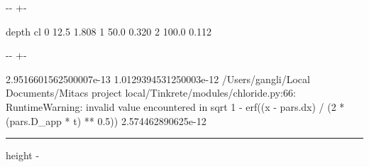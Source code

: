 \documentclass[letterpaper,10pt,english]{sphinxmanual}
\newlength\nbsphinxcodecellspacing
\begin{document}
{

\kern-\sphinxverbatimsmallskipamount\kern-\baselineskip
\kern+\FrameHeightAdjust\kern-\fboxrule
\vspace{\nbsphinxcodecellspacing}

\begin{sphinxVerbatim}[commandchars=\\\{\}]
   depth     cl
0   12.5  1.808
1   50.0  0.320
2  100.0  0.112
\end{sphinxVerbatim}
}

{
\begin{sphinxVerbatim}[commandchars=\\\{\}]
\llap{\color{nbsphinxin}[11]:\,\hspace{\fboxrule}\hspace{\fboxsep}}
    
\end{sphinxVerbatim}
}

{

\kern-\sphinxverbatimsmallskipamount\kern-\baselineskip
\kern+\FrameHeightAdjust\kern-\fboxrule
\vspace{\nbsphinxcodecellspacing}

\begin{sphinxVerbatim}[commandchars=\\\{\}]
2.9516601562500007e-13
1.0129394531250003e-12
/Users/gangli/Local Documents/Mitacs project local/Tinkrete/modules/chloride.py:66: RuntimeWarning: invalid value encountered in sqrt
  1 - erf((x - pars.dx) / (2 * (pars.D\_app * t) ** 0.5))
2.574462890625e-12
\end{sphinxVerbatim}
}

\hrule height -\fboxrule\relax
\vspace{\nbsphinxcodecellspacing}

\makeatletter\setbox\nbsphinxpromptbox\box\voidb@x\makeatother
\end{document}
